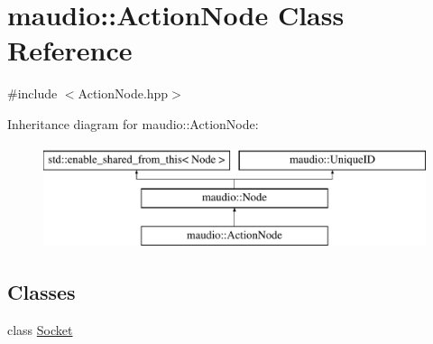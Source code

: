 \hypertarget{classmaudio_1_1ActionNode}{\section{maudio\-:\-:Action\-Node Class Reference}
\label{classmaudio_1_1ActionNode}
}


{\ttfamily \#include $<$Action\-Node.\-hpp$>$}

Inheritance diagram for maudio\-:\-:Action\-Node\-:\begin{figure}[H]
\begin{center}
\leavevmode
\includegraphics[height=3.000000cm]{classmaudio_1_1ActionNode}
\end{center}
\end{figure}
\subsection*{Classes}
\begin{DoxyCompactItemize}
\item 
class \hyperlink{classmaudio_1_1ActionNode_1_1Socket}{Socket}
\end{DoxyCompactItemize}
